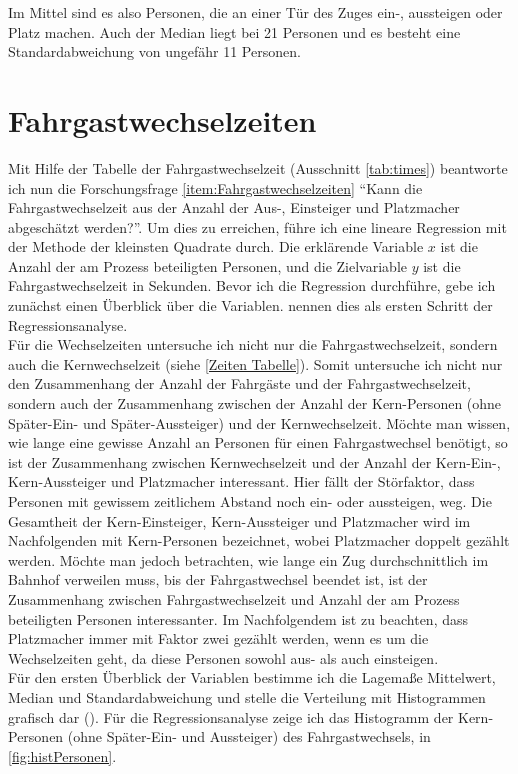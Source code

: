 Im Mittel sind es also  Personen, die an einer Tür des Zuges ein-, aussteigen oder Platz machen. Auch der Median liegt bei 21 Personen und es besteht eine Standardabweichung von ungefähr 11 Personen.
\section{Fahrgastwechselzeiten} \label{Zeiten}
Mit Hilfe der Tabelle der Fahrgastwechselzeit (Ausschnitt \tablename \ref{tab:times}) beantworte ich nun die Forschungsfrage \ref{item:Fahrgastwechselzeiten} "`Kann die Fahrgastwechselzeit aus der Anzahl der \mbox{Aus-,} Einsteiger und Platzmacher abgeschätzt werden?"'. Um dies zu erreichen, führe ich eine lineare Regression mit der Methode der kleinsten Quadrate durch. Die erklärende Variable $x$ ist die Anzahl der am Prozess beteiligten Personen, und die Zielvariable $y$ ist die Fahrgastwechselzeit in Sekunden. Bevor ich die Regression durchführe, gebe ich zunächst einen Überblick über die Variablen. \cite{Fahrmeir.2009} nennen dies als ersten Schritt der Regressionsanalyse. \\
Für die Wechselzeiten untersuche ich nicht nur die Fahrgastwechselzeit, sondern auch die Kernwechselzeit (siehe \ref{Zeiten Tabelle}). Somit untersuche ich nicht nur den Zusammenhang der Anzahl der Fahrgäste und der Fahrgastwechselzeit, sondern auch der Zusammenhang zwischen der Anzahl der Kern-Personen (ohne Später-Ein- und Später-Aussteiger) und der Kernwechselzeit. Möchte man wissen, wie lange eine gewisse Anzahl an Personen für einen Fahrgastwechsel benötigt, so ist der Zusammenhang zwischen Kernwechselzeit und der Anzahl der Kern-Ein-, Kern-Aussteiger und Platzmacher interessant. Hier fällt der Störfaktor, dass Personen mit gewissem zeitlichem Abstand noch ein- oder aussteigen, weg. Die Gesamtheit der Kern-Einsteiger, Kern-Aussteiger und Platzmacher wird im Nachfolgenden mit Kern-Personen bezeichnet, wobei Platzmacher doppelt gezählt werden. Möchte man jedoch betrachten, wie lange ein Zug durchschnittlich im Bahnhof verweilen muss, bis der Fahrgastwechsel beendet ist, ist der Zusammenhang zwischen Fahrgastwechselzeit und Anzahl der am Prozess beteiligten Personen interessanter. Im Nachfolgendem ist zu beachten, dass Platzmacher immer mit Faktor zwei gezählt werden, wenn es um die Wechselzeiten geht, da diese Personen sowohl aus- als auch einsteigen.\\ 
Für den ersten Überblick der Variablen bestimme ich die Lagemaße Mittelwert, Median und Standardabweichung und stelle die Verteilung mit Histogrammen grafisch dar (\cite{Fahrmeir.2009}). Für die Regressionsanalyse zeige ich das Histogramm der Kern-Personen (ohne Später-Ein- und Aussteiger) des Fahrgastwechsels, in \figurename \ref{fig:histPersonen}.
